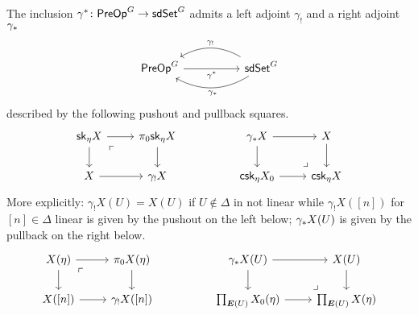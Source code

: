 \documentclass[a4paper,10pt
,draft
]{article}%
\numberwithin{equation}{section}
\numberwithin{figure}{section}
\theoremstyle{definition} %
\newcommand{\1}{\ensuremath{\mathbbm 1}}%
\begin{document}
The inclusion 
$\gamma^{\**} \colon \mathsf{PreOp}^G \to \mathsf{sdSet}^G$
admits a left adjoint $\gamma_!$
and a right adjoint $\gamma_{\**}$
\[
      \begin{tikzcd}[column sep =5em]
            \mathsf{PreOp}^G \ar{r}[swap]{\gamma^{\**}} 
            &
            \mathsf{sdSet}^G
            \ar[bend right]{l}[swap,midway]{\gamma_{!}}
            \ar[bend left]{l}{\gamma_{\**}}
      \end{tikzcd}
\]
described by the following pushout and pullback squares.
\begin{equation}\label{GAMMASTAR_EQ}
\begin{tikzcd}
	\mathsf{sk}_{\eta} X \ar{r} \ar{d} \arrow[dr, phantom, "\ulcorner", very near start]  
&
	\pi_0 \mathsf{sk}_{\eta} X \ar{d}
&& 
	\gamma_{\**}X \ar{r} \ar{d} 
&
	X \ar{d}
\\
	X \ar{r} 
&
	\gamma_! X 
&&
	\mathsf{csk}_{\eta} X_0
	\ar{r} 
&
	\mathsf{csk}_{\eta} X 
	\arrow[lu, phantom, "\lrcorner", very near start]
\end{tikzcd}
\end{equation}
More explicitly: 
$\gamma_{!}X (U) = X(U)$ if $U \not \in \Delta$
in not linear
while $\gamma_{!}X ([n])$ for $[n] \in \Delta$ linear is given by the pushout on the left below; 
$\gamma_{\**}X(U)$ is given by the pullback on the right below.
\begin{equation}\label{GAMMASTAR2_EQ}
      \begin{tikzcd}
            X(\eta) \ar{r} \ar{d} \arrow[dr, phantom, "\ulcorner", very near start]  &
            \pi_0 X(\eta) \ar{d}
            && 
            \gamma_{\**}X(U) \ar{r} \ar{d} & X(U) \ar{d}
            \\
            X([n]) \ar{r} & \gamma_! X([n]) 
            &&
            \prod_{\boldsymbol{E}(U)} X_0(\eta) \ar{r} &
            \prod_{\boldsymbol{E}(U)} X(\eta)
            \arrow[lu, phantom, "\lrcorner", very near start]
      \end{tikzcd}
\end{equation}


\end{document}
